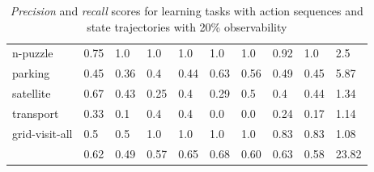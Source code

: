 \begin{table}[hbt!]
\begin{center}
\begin{tabular}{l|l|l|l|l|l|l||l|l|l|}
			n-puzzle & 0.75 & 1.0 & 1.0 & 1.0 & 1.0 & 1.0 & 0.92 & 1.0& 2.5 \\ %
			parking & 0.45 & 0.36 & 0.4 & 0.44 & 0.63 & 0.56 & 0.49 & 0.45& 5.87 \\ %
			satellite & 0.67 & 0.43 & 0.25 & 0.4 & 0.29 & 0.5 & 0.4 & 0.44& 1.34 \\ %
			transport & 0.33 & 0.1 & 0.4 & 0.4 & 0.0 & 0.0 & 0.24 & 0.17& 1.14 \\ %
			grid-visit-all & 0.5 & 0.5 & 1.0 & 1.0 & 1.0 & 1.0 & 0.83 & 0.83& 1.08 \\ %
			
			\hline
			\bf & 0.62 & 0.49 & 0.57 & 0.65 & 0.68 & 0.60 & 0.63 & 0.58	& 23.82	 \\
		\end{tabular}
		
	\end{center}
	\caption{\small {\em Precision} and {\em recall} scores for learning tasks with \NO action sequences and \PO state trajectories with 20\% observability}
	\label{tab:results_minimum_0_20}
\end{table}




